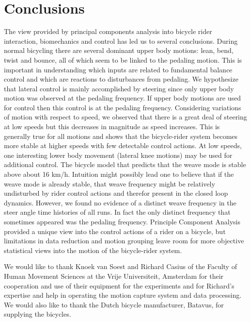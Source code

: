 \documentclass[smallextended]{svjour3}     %
\begin{document}
\section{Conclusions}
\label{sec:conclusions}
The view provided by principal components analysis into bicycle rider
interaction, biomechanics and control has led us to several conclusions. During
normal bicycling there are several dominant upper body motions: lean, bend, twist and
bounce, all of which seem to be linked to the pedaling motion. This is important in
understanding which inputs are related to fundamental balance
control and which are reactions to disturbances from pedaling. We hypothesize
that lateral control is mainly accomplished by steering
since only upper body motion was observed at the pedaling frequency. If
upper body motions are used for control then this control is at the pedaling
frequency. Considering variations of motion with respect to speed, we observed that there is
a great deal of steering at low speeds but this decreases in magnitude as speed
increases. This is generally true for all motions and shows that the
bicycle-rider system becomes more stable at higher speeds with few
detectable control actions. At low speeds, one interesting lower body movement
(lateral knee motions) may be used for
additional control. The bicycle model that predicts that the weave
mode is stable above about 16 km/h. Intuition might possibly lead one to believe
that if the weave mode is already stable, that weave frequency might be
relatively undisturbed by rider control actions and therefor present in the
closed loop dynamics. However, we found no evidence of a distinct
weave frequency in the steer angle time histories of all runs. In fact the only
distinct frequency that sometimes appeared was the pedaling frequency.
Principle Component Analysis provided a unique view
into the control actions of a rider on a bicycle, but limitations in data
reduction and motion grouping leave room for more objective statistical
views into the motion of the bicycle-rider system.
\begin{acknowledgements}
We would like to thank Knoek van Soest and Richard Casius of the Faculty of
Human Movement Sciences at the Vrije Universiteit, Amsterdam for their cooperation and use
of their equipment for the experiments and for Richard's expertise and help in
operating the motion capture system and data processing. We would also like to
thank the Dutch bicycle manufacturer, Batavus, for supplying the bicycles.
\end{acknowledgements}
\end{document}
